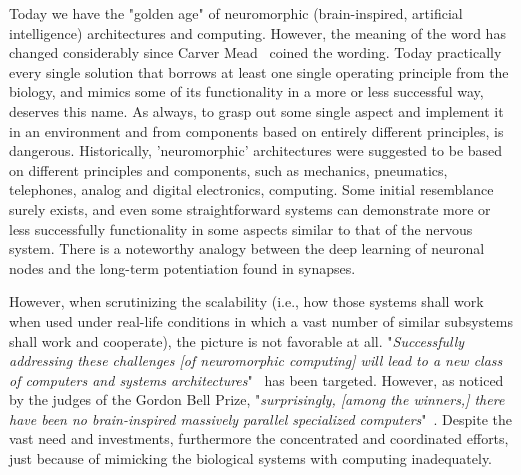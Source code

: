 	




Today we have the "golden age" of neuromorphic (brain-inspired, artificial intelligence)  architectures and computing. However, the meaning of the word has changed considerably since Carver Mead~\cite{NeuromorphicSystems:1990}  coined the wording.
Today practically every single solution that borrows at least one single operating principle from the biology, and mimics some of its functionality in a more or less successful way, deserves this name. As always, to grasp out some single aspect and implement it in an environment and from components based on entirely different principles, is dangerous.
Historically, 'neuromorphic' architectures were suggested to be based on different principles and components, such as mechanics, pneumatics, telephones, analog and digital electronics, computing. Some initial resemblance surely exists, and even some straightforward systems can demonstrate more or less successfully functionality in some aspects similar to that of the nervous system. There is a noteworthy analogy between the deep learning of neuronal nodes and the long-term potentiation found in synapses.

However, when scrutinizing the scalability (i.e., how those systems shall work when used under real-life conditions in which a vast number of similar subsystems shall work and cooperate), the picture is not favorable at all.
"\textit{Successfully addressing these challenges [of neuromorphic computing] will lead to a new class of computers and systems architectures}"~\cite{NeuromorphicComputing:2015} has been targeted. However, as noticed by the judges of the Gordon Bell Prize, "\textit{surprisingly, [among the winners,] there have been no brain-inspired massively parallel specialized computers}"~\cite{GordonBellPrize:2017}. Despite the vast need and investments, furthermore the concentrated and coordinated efforts, just because of mimicking the biological systems with computing inadequately.

